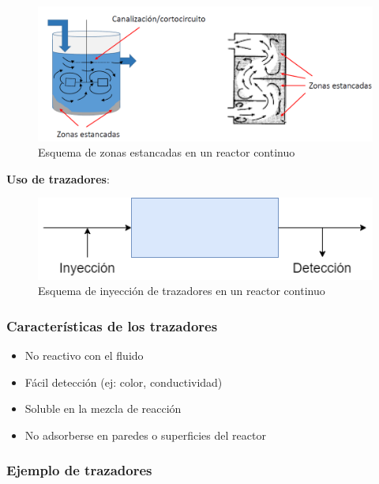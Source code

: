         \begin{figure}
            \centering
            \includegraphics[width=\textwidth]{img/esquemas/zonas_estancadas.png}
            \caption[Esquema de zonas estancadas en un reactor continuo]{Esquema de zonas estancadas en un reactor continuo \cite{martinez_basterrechea_iq4305_2021}}
            \label{fig:zonas_estancadas}
        \end{figure}
        
        \textbf{Uso de trazadores}:
        
        \begin{figure}
            \centering
            \includegraphics[width=.6\textwidth]{img/diagramas/trazadores.png}
            \caption{Esquema de inyección de trazadores en un reactor continuo}
            \label{fig:trazadores_reactor}
        \end{figure}
        
        \subsubsection{Características de los trazadores}
        
        \begin{itemize}
            \item No reactivo con el fluido
            \item Fácil detección (ej: color, conductividad)
            \item Soluble en la mezcla de reacción
            \item No adsorberse en paredes o superficies del reactor
        \end{itemize}
        
        \subsubsection{Ejemplo de trazadores}
        
